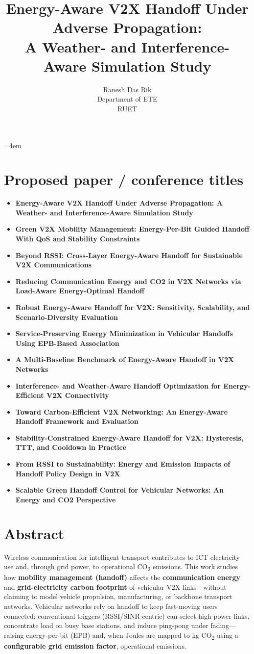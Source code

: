 \documentclass[conference]{IEEEtran}
\title{\textbf{Energy-Aware V2X Handoff Under Adverse Propagation:\\ A Weather- and Interference-Aware Simulation Study}}
\author{Ranesh Das Rik \\ Department of ETE \\ RUET}
\begin{document}
\raggedbottom
\maketitle
\emergencystretch=4em

\section{Proposed paper / conference titles}
\begin{itemize}
\item \textbf{Energy-Aware V2X Handoff Under Adverse Propagation: A Weather- and Interference-Aware Simulation Study}
\item \textbf{Green V2X Mobility Management: Energy-Per-Bit Guided Handoff With QoS and Stability Constraints}
\item \textbf{Beyond RSSI: Cross-Layer Energy-Aware Handoff for Sustainable V2X Communications}
\item \textbf{Reducing Communication Energy and CO2 in V2X Networks via Load-Aware Energy-Optimal Handoff}
\item \textbf{Robust Energy-Aware Handoff for V2X: Sensitivity, Scalability, and Scenario-Diversity Evaluation}
\item \textbf{Service-Preserving Energy Minimization in Vehicular Handoffs Using EPB-Based Association}
\item \textbf{A Multi-Baseline Benchmark of Energy-Aware Handoff in V2X Networks}
\item \textbf{Interference- and Weather-Aware Handoff Optimization for Energy-Efficient V2X Connectivity}
\item \textbf{Toward Carbon-Efficient V2X Networking: An Energy-Aware Handoff Framework and Evaluation}
\item \textbf{Stability-Constrained Energy-Aware Handoff for V2X: Hysteresis, TTT, and Cooldown in Practice}
\item \textbf{From RSSI to Sustainability: Energy and Emission Impacts of Handoff Policy Design in V2X}
\item \textbf{Scalable Green Handoff Control for Vehicular Networks: An Energy and CO2 Perspective}
\end{itemize}


\section{Abstract}

Wireless communication for intelligent transport contributes to ICT electricity use and, through grid power, to operational CO\textsubscript{2} emissions. This work studies how \textbf{mobility management (handoff)} affects the \textbf{communication energy} and \textbf{grid-electricity carbon footprint} of vehicular V2X links---without claiming to model vehicle propulsion, manufacturing, or backbone transport networks. Vehicular networks rely on handoff to keep fast-moving users connected; conventional triggers (RSSI/SINR-centric) can select high-power links, concentrate load on busy base stations, and induce ping-pong under fading---raising energy-per-bit (EPB) and, when Joules are mapped to kg CO\textsubscript{2} using a \textbf{configurable grid emission factor}, operational emissions.
\end{document}
